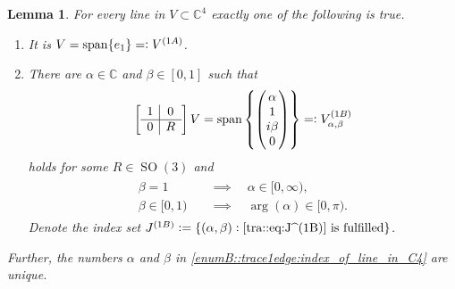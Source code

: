 \documentclass{amsart}
\newtheorem{lemma}[thm]{Lemma}
\newcommand{\C}{\mathbb{C}}
\DeclareMathOperator{\SO}{SO}
\DeclareMathOperator{\spann}{span}
\begin{document}
\begin{lemma}
    \label{t1e::lemma:classification_of_lines_V}
    For every line in $V\subset\C^4$ exactly one of the following is true. 
    \begin{enumerate}[label=(\Alph*)]
        \item\label{enumA::trace1edge:index_of_line_in_C4} It is $V= \spann\{e_1\}=\vcentcolon V^{(1A)}$.
        \item\label{enumB::trace1edge:index_of_line_in_C4} There are $\alpha \in \C$ and $\beta \in [0,1]$  such that
        \begin{align*}
        \left[\begin{array}{c|c}
                1& 0 \\
                \hline
                0 & R 
                \end{array}\right]
            V =  \spann\left\{ \begin{pmatrix}
                    \alpha \\ 1 \\ i \beta \\ 0
                \end{pmatrix} \right\}
                =\vcentcolon
                V^{(1B)}_{\alpha,\beta}
        \end{align*}
        holds for some $R \in \SO(3)$ and 
        \begin{align}
        \label{tra::eq:J^(1B)}\tag{$\ast$}
        \begin{aligned}
                \beta = 1 \quad &\implies \quad \alpha \in [0, \infty), \\
                \beta \in [0,1) \quad &\implies \quad \arg(\alpha) \in [0, \pi).
        \end{aligned}
        \end{align}
        Denote the index set $
        J^{(1B)}\vcentcolon=
        \{(\alpha,\beta)\vcentcolon\text{\eqref{tra::eq:J^(1B)} is fulfilled}\}$.
    \end{enumerate}
    Further, the numbers $\alpha$ and $\beta$ in \ref{enumB::trace1edge:index_of_line_in_C4} are unique.
\end{lemma}

 
\end{document}
